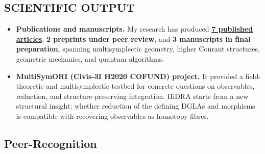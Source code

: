 \documentclass[a4paper,fontsize=11bp]{scrartcl}
\newcommand{\ProjectAcronym}{HiDRA}
\newenvironment{refsection}{\begingroup}{\endgroup}
\begin{document}
\begin{refsection}

\subsection*{SCIENTIFIC OUTPUT}


\begin{itemize}
\setlength{\itemsep}{0.1\baselineskip}
\setlength{\parsep}{0pt}
\item \textbf{Publications and manuscripts.} My research has produced \href{https://www.antoniomiti.it/research/}{\textbf{7 published articles}}, \textbf{2 preprints under peer review}, and \textbf{3 manuscripts in final preparation}, spanning multisymplectic geometry, higher Courant structures, geometric mechanics, and quantum algorithms.

\item \textbf{MultiSymORI (Civis-3I H2020 COFUND) project.} It provided a field-theoretic and multisymplectic testbed for concrete questions on observables, reduction, and structure-preserving integration. \ProjectAcronym{} starts from a new structural insight: whether reduction of the defining DGLAs and morphisms is compatible with recovering observables as homotopy fibres. 


\end{itemize}


\subsection*{Peer-Recognition}


\end{refsection}
\end{document}
